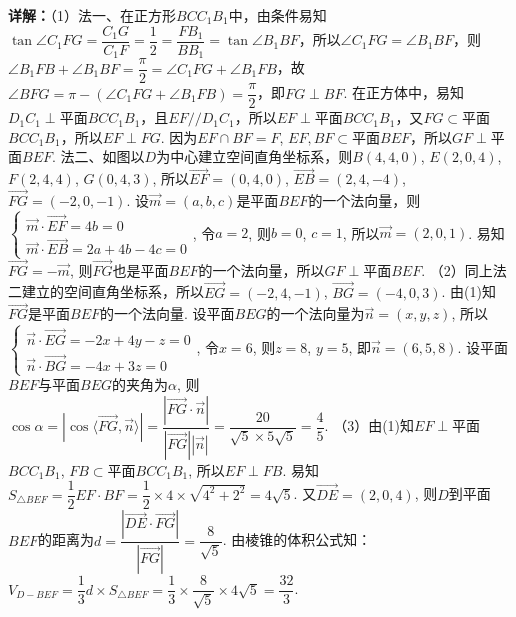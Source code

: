 \begin{question}[points=15]
\begin{solution}
\textbf{详解：}（1）法一、在正方形$BCC_1B_1$中，由条件易知$\tan\angle C_1FG = \dfrac{C_1G}{C_1F} = \dfrac{1}{2} = \dfrac{FB_1}{BB_1} = \tan\angle B_1BF$，所以$\angle C_1FG = \angle B_1BF$，则$\angle B_1FB + \angle B_1BF = \dfrac{\pi}{2} = \angle C_1FG + \angle B_1FB$，故$\angle BFG = \pi - (\angle C_1FG + \angle B_1FB) = \dfrac{\pi}{2}$，即$FG \perp BF$. 在正方体中，易知$D_1C_1 \perp$平面$BCC_1B_1$，且$EF // D_1C_1$，所以$EF \perp$平面$BCC_1B_1$，又$FG \subset$平面$BCC_1B_1$，所以$EF \perp FG$. 因为$EF \cap BF = F$, $EF, BF \subset$平面$BEF$，所以$GF \perp$平面$BEF$.
法二、如图以$D$为中心建立空间直角坐标系，则$B(4,4,0)$, $E(2,0,4)$, $F(2,4,4)$, $G(0,4,3)$, 所以$\overrightarrow{EF} = (0,4,0)$, $\overrightarrow{EB} = (2,4,-4)$, $\overrightarrow{FG} = (-2,0,-1)$. 设$\vec{m} = (a,b,c)$是平面$BEF$的一个法向量，则$\begin{cases} \vec{m} \cdot \overrightarrow{EF} = 4b = 0 \\ \vec{m} \cdot \overrightarrow{EB} = 2a + 4b - 4c = 0 \end{cases}$, 令$a=2$, 则$b=0$, $c=1$, 所以$\vec{m} = (2,0,1)$. 易知$\overrightarrow{FG} = -\vec{m}$, 则$\overrightarrow{FG}$也是平面$BEF$的一个法向量，所以$GF \perp$平面$BEF$.
（2）同上法二建立的空间直角坐标系，所以$\overrightarrow{EG} = (-2,4,-1)$, $\overrightarrow{BG} = (-4,0,3)$. 由(1)知$\overrightarrow{FG}$是平面$BEF$的一个法向量. 设平面$BEG$的一个法向量为$\vec{n} = (x,y,z)$, 所以$\begin{cases} \vec{n} \cdot \overrightarrow{EG} = -2x + 4y - z = 0 \\ \vec{n} \cdot \overrightarrow{BG} = -4x + 3z = 0 \end{cases}$, 令$x=6$, 则$z=8$, $y=5$, 即$\vec{n} = (6,5,8)$. 设平面$BEF$与平面$BEG$的夹角为$\alpha$, 则$\cos\alpha = |\cos\langle\overrightarrow{FG},\vec{n}\rangle| = \dfrac{|\overrightarrow{FG}\cdot\vec{n}|}{|\overrightarrow{FG}||\vec{n}|} = \dfrac{20}{\sqrt{5} \times 5\sqrt{5}} = \dfrac{4}{5}$.
（3）由(1)知$EF \perp$平面$BCC_1B_1$, $FB \subset$平面$BCC_1B_1$, 所以$EF \perp FB$. 易知$S_{\triangle BEF} = \dfrac{1}{2} EF \cdot BF = \dfrac{1}{2} \times 4 \times \sqrt{4^2 + 2^2} = 4\sqrt{5}$. 又$\overrightarrow{DE} = (2,0,4)$, 则$D$到平面$BEF$的距离为$d = \dfrac{|\overrightarrow{DE} \cdot \overrightarrow{FG}|}{|\overrightarrow{FG}|} = \dfrac{8}{\sqrt{5}}$. 由棱锥的体积公式知：$V_{D-BEF} = \dfrac{1}{3} d \times S_{\triangle BEF} = \dfrac{1}{3} \times \dfrac{8}{\sqrt{5}} \times 4\sqrt{5} = \dfrac{32}{3}$.
\end{solution}
\end{question}

